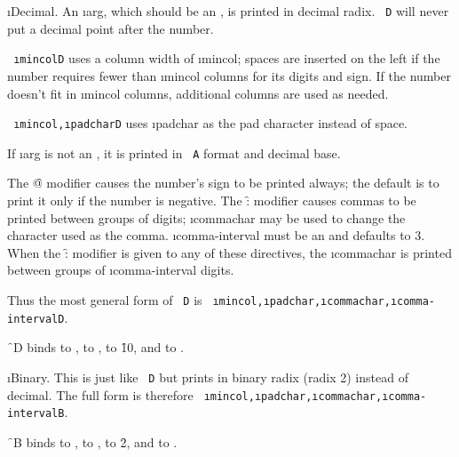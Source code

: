 
\i{Decimal}.
An \i{arg}, which should be an , 
is printed in decimal radix.
{\tt ~D} will never put a decimal point after the number.

{\tt ~\i{mincol}D} uses 
a column width of \i{mincol}; spaces are inserted on
the left if the number requires fewer than \i{mincol} columns for its digits
and sign.  If the number doesn't fit in \i{mincol} columns, additional columns
are used as needed.

{\tt ~\i{mincol},\i{padchar}D} uses \i{padchar} as the pad character
instead of space.

If \i{arg} is not an , it is printed in {\tt ~A} format and decimal base.

The \f{@} modifier causes the number's sign to be printed always; the default
is to print it only if the number is negative.
The \f{:} modifier causes commas to be printed between groups of digits;
\i{commachar} may be used to change the character used as the comma.
\i{comma-interval} 
must be an  and defaults to 3.  When the \f{:} 
modifier is given to any of
these directives, the \i{commachar} 
is printed between groups of \i{comma-interval}
digits.

Thus the most general form of {\tt ~D} is
{\tt ~\i{mincol},\i{padchar},\i{commachar},\i{comma-interval}D}.

\f{~D} binds
      to ,
      to ,
      to \f{10},
 and  to .


\i{Binary}.
This is just like {\tt ~D} but prints in binary radix (radix 2)
instead of decimal.  The full form is therefore
{\tt ~\i{mincol},\i{padchar},\i{commachar},\i{comma-interval}B}.

\f{~B} binds
      to ,
      to ,
      to \f{2},
 and  to .

